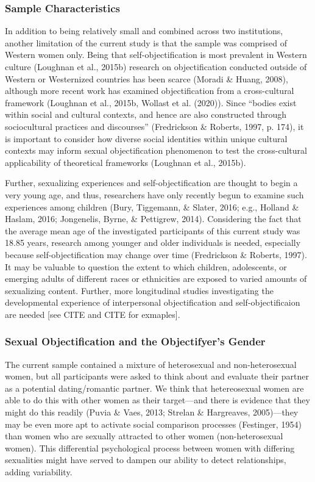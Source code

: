 \documentclass[man]{apa6}
\begin{document}
\subsubsection{Sample Characteristics}\label{sample-characteristics}

In addition to being relatively small and combined across two
institutions, another limitation of the current study is that the sample
was comprised of Western women only. Being that self-objectification is
most prevalent in Western culture (Loughnan et al., 2015b) research on
objectification conducted outside of Western or Westernized countries
has been scarce (Moradi \& Huang, 2008), although more recent work has
examined objectification from a cross-cultural framework (Loughnan et
al., 2015b, Wollast et al. (2020)). Since \enquote{bodies exist within
social and cultural contexts, and hence are also constructed through
sociocultural practices and discourses} (Fredrickson \& Roberts, 1997,
p. 174), it is important to consider how diverse social identities
within unique cultural contexts may inform sexual objectification
phenomenon to test the cross-cultural applicability of theoretical
frameworks (Loughnan et al., 2015b).

Further, sexualizing experiences and self-objectification are thought to
begin a very young age, and thus, researchers have only recently begun
to examine such experiences among children (Bury, Tiggemann, \& Slater,
2016; e.g., Holland \& Haslam, 2016; Jongenelis, Byrne, \& Pettigrew,
2014). Considering the fact that the average mean age of the
investigated participants of this current study was 18.85 years,
research among younger and older individuals is needed, especially
because self-objectification may change over time (Fredrickson \&
Roberts, 1997). It may be valuable to question the extent to which
children, adolescents, or emerging adults of different races or
ethnicities are exposed to varied amounts of sexualizing content.
Further, more longitudinal studies investigating the developmental
experience of interpersonal objectification and self-objectificaion are
needed {[}see CITE and CITE for exmaples{]}.

\subsubsection{Sexual Objectification and the Objectifyer's
Gender}\label{sexual-objectification-and-the-objectifyers-gender}

The current sample contained a mixture of heterosexual and
non-heterosexual women, but all participants were asked to think about
and evaluate their partner as a potential dating/romantic partner. We
think that hetereosexual women are able to do this with other women as
their target---and there is evidence that they might do this readily
(Puvia \& Vaes, 2013; Strelan \& Hargreaves, 2005)---they may be even
more apt to activate social comparison processes (Festinger, 1954) than
women who are sexually attracted to other women (non-heterosexual
women). This differential psychological process between women with
differing sexualities might have served to dampen our ability to detect
relationships, adding variability.
\end{document}
